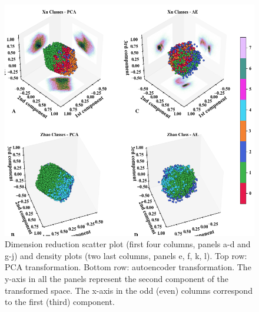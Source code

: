 \documentclass[utf8]{frontiersSCNS} %
\begin{document}
\begin{figure}[h!]
	\begin{center}
		\includegraphics[width=16cm]{Amaya/dimreduc}%
	\end{center}
	\caption{Dimension reduction scatter plot (first four columns, panels a-d and g-j) and density plots (two last columns, panels e, f, k, l). Top row: PCA transformation. Bottom row: autoencoder transformation. The y-axis in all the panels represent the second component of the transformed space. The x-axis in the odd (even) columns correspond to the first (third) component.}\label{fig:dimreduc}
\end{figure}
\end{document}
